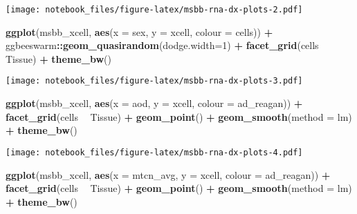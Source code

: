 \documentclass[]{book}
\newenvironment{Shaded}{\begin{snugshade}}{\end{snugshade}}
\newcommand{\DataTypeTok}[1]{\textcolor[rgb]{0.13,0.29,0.53}{#1}}
\newcommand{\DecValTok}[1]{\textcolor[rgb]{0.00,0.00,0.81}{#1}}
\newcommand{\KeywordTok}[1]{\textcolor[rgb]{0.13,0.29,0.53}{\textbf{#1}}}
\newcommand{\NormalTok}[1]{#1}
\newcommand{\OperatorTok}[1]{\textcolor[rgb]{0.81,0.36,0.00}{\textbf{#1}}}
\newcommand{\StringTok}[1]{\textcolor[rgb]{0.31,0.60,0.02}{#1}}
\begin{document}
\texttt{[image: notebook\_files/figure-latex/msbb-rna-dx-plots-2.pdf]}

\begin{Shaded}
\begin{Highlighting}[]
\KeywordTok{ggplot}\NormalTok{(msbb_xcell, }\KeywordTok{aes}\NormalTok{(}\DataTypeTok{x =}\NormalTok{ sex, }\DataTypeTok{y =}\NormalTok{ xcell, }\DataTypeTok{colour =}\NormalTok{ cells)) }\OperatorTok{+}\StringTok{ }
\StringTok{  }\NormalTok{ggbeeswarm}\OperatorTok{::}\KeywordTok{geom_quasirandom}\NormalTok{(}\DataTypeTok{dodge.width=}\DecValTok{1}\NormalTok{) }\OperatorTok{+}\StringTok{ }
\StringTok{  }\KeywordTok{facet_grid}\NormalTok{(cells }\OperatorTok{~}\StringTok{ }\NormalTok{Tissue) }\OperatorTok{+}\StringTok{ }
\StringTok{  }\KeywordTok{theme_bw}\NormalTok{()}
\end{Highlighting}
\end{Shaded}

\texttt{[image: notebook\_files/figure-latex/msbb-rna-dx-plots-3.pdf]}

\begin{Shaded}
\begin{Highlighting}[]
\KeywordTok{ggplot}\NormalTok{(msbb_xcell, }\KeywordTok{aes}\NormalTok{(}\DataTypeTok{x =}\NormalTok{ aod, }\DataTypeTok{y =}\NormalTok{ xcell, }\DataTypeTok{colour =}\NormalTok{ ad_reagan)) }\OperatorTok{+}\StringTok{ }
\StringTok{  }\KeywordTok{facet_grid}\NormalTok{(cells }\OperatorTok{~}\StringTok{ }\NormalTok{Tissue) }\OperatorTok{+}
\StringTok{  }\KeywordTok{geom_point}\NormalTok{() }\OperatorTok{+}\StringTok{ }
\StringTok{  }\KeywordTok{geom_smooth}\NormalTok{(}\DataTypeTok{method =}\NormalTok{ lm) }\OperatorTok{+}\StringTok{ }
\StringTok{  }\KeywordTok{theme_bw}\NormalTok{()}
\end{Highlighting}
\end{Shaded}

\texttt{[image: notebook\_files/figure-latex/msbb-rna-dx-plots-4.pdf]}

\begin{Shaded}
\begin{Highlighting}[]
\KeywordTok{ggplot}\NormalTok{(msbb_xcell, }\KeywordTok{aes}\NormalTok{(}\DataTypeTok{x =}\NormalTok{ mtcn_avg, }\DataTypeTok{y =}\NormalTok{ xcell, }\DataTypeTok{colour =}\NormalTok{ ad_reagan)) }\OperatorTok{+}\StringTok{ }
\StringTok{  }\KeywordTok{facet_grid}\NormalTok{(cells }\OperatorTok{~}\StringTok{ }\NormalTok{Tissue) }\OperatorTok{+}
\StringTok{  }\KeywordTok{geom_point}\NormalTok{() }\OperatorTok{+}\StringTok{ }
\StringTok{  }\KeywordTok{geom_smooth}\NormalTok{(}\DataTypeTok{method =}\NormalTok{ lm) }\OperatorTok{+}\StringTok{ }
\StringTok{  }\KeywordTok{theme_bw}\NormalTok{()}
\end{Highlighting}
\end{Shaded}
\end{document}
